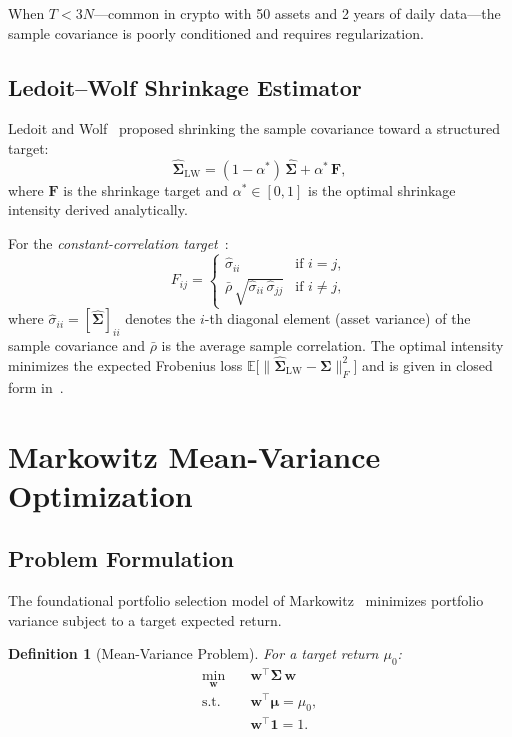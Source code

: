 \documentclass[12pt,a4paper]{article}
\newtheorem{definition}{Definition}[section]
\newcommand{\E}{\mathbb{E}}
\begin{document}
When $T < 3N$---common in crypto with 50 assets and 2 years of daily data---the sample covariance is poorly conditioned and requires regularization.

\subsection{Ledoit--Wolf Shrinkage Estimator}
\label{sec:ledoit-wolf}

Ledoit and Wolf~\cite{ledoit2004} proposed shrinking the sample covariance toward a structured target:
\begin{equation}
    \hat{\bm{\Sigma}}_{\text{LW}} = (1 - \alpha^*)\,\hat{\bm{\Sigma}} + \alpha^*\,\bm{F},
    \label{eq:ledoit-wolf}
\end{equation}
where $\bm{F}$ is the shrinkage target and $\alpha^* \in [0,1]$ is the optimal shrinkage intensity derived analytically.

For the \emph{constant-correlation target}~\cite{ledoit2003}:
\begin{equation}
    F_{ij} = \begin{cases}
        \hat{\sigma}_{ii} & \text{if } i = j, \\
        \bar{\rho}\,\sqrt{\hat{\sigma}_{ii}\,\hat{\sigma}_{jj}} & \text{if } i \neq j,
    \end{cases}
\end{equation}
where $\hat{\sigma}_{ii} = [\hat{\bm{\Sigma}}]_{ii}$ denotes the $i$-th diagonal element (asset variance) of the sample covariance and $\bar{\rho}$ is the average sample correlation. The optimal intensity minimizes the expected Frobenius loss $\E\bigl[\|\hat{\bm{\Sigma}}_{\text{LW}} - \bm{\Sigma}\|_F^2\bigr]$ and is given in closed form in~\cite{ledoit2004}.

\section{Markowitz Mean-Variance Optimization}
\label{sec:markowitz}

\subsection{Problem Formulation}

The foundational portfolio selection model of Markowitz~\cite{markowitz1952} minimizes portfolio variance subject to a target expected return.

\begin{definition}[Mean-Variance Problem]
For a target return $\mu_0$:
\begin{equation}
\boxed{
\begin{aligned}
    \min_{\bm{w}} \quad & \bm{w}^\top \bm{\Sigma}\, \bm{w} \\
    \text{s.t.} \quad & \bm{w}^\top \bm{\mu} = \mu_0, \\
                      & \bm{w}^\top \bm{1} = 1.
\end{aligned}
}
\label{eq:mvo}
\end{equation}
\end{definition}
\end{document}
